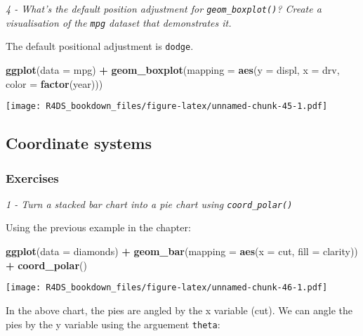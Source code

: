 \documentclass[]{article}
\newenvironment{Shaded}{\begin{snugshade}}{\end{snugshade}}
\newcommand{\KeywordTok}[1]{\textcolor[rgb]{0.13,0.29,0.53}{\textbf{#1}}}
\newcommand{\DataTypeTok}[1]{\textcolor[rgb]{0.13,0.29,0.53}{#1}}
\newcommand{\StringTok}[1]{\textcolor[rgb]{0.31,0.60,0.02}{#1}}
\newcommand{\OperatorTok}[1]{\textcolor[rgb]{0.81,0.36,0.00}{\textbf{#1}}}
\newcommand{\NormalTok}[1]{#1}
\theoremstyle{definition}
\theoremstyle{definition}
\theoremstyle{definition}
\theoremstyle{remark}
\begin{document}
\emph{4 - What's the default position adjustment for
\texttt{geom\_boxplot()}? Create a visualisation of the \texttt{mpg}
dataset that demonstrates it.}

The default positional adjustment is \texttt{dodge}.

\begin{Shaded}
\begin{Highlighting}[]
\KeywordTok{ggplot}\NormalTok{(}\DataTypeTok{data =}\NormalTok{ mpg) }\OperatorTok{+}
\StringTok{  }\KeywordTok{geom_boxplot}\NormalTok{(}\DataTypeTok{mapping =} \KeywordTok{aes}\NormalTok{(}\DataTypeTok{y =}\NormalTok{ displ, }\DataTypeTok{x =}\NormalTok{ drv, }\DataTypeTok{color =} \KeywordTok{factor}\NormalTok{(year)))}
\end{Highlighting}
\end{Shaded}

\texttt{[image: R4DS\_bookdown\_files/figure-latex/unnamed-chunk-45-1.pdf]}

\subsection{Coordinate systems}\label{coordinate-systems}

\subsubsection{Exercises}\label{exercises-6}

\emph{1 - Turn a stacked bar chart into a pie chart using
\texttt{coord\_polar()}}

Using the previous example in the chapter:

\begin{Shaded}
\begin{Highlighting}[]
\KeywordTok{ggplot}\NormalTok{(}\DataTypeTok{data =}\NormalTok{ diamonds) }\OperatorTok{+}\StringTok{ }
\StringTok{  }\KeywordTok{geom_bar}\NormalTok{(}\DataTypeTok{mapping =} \KeywordTok{aes}\NormalTok{(}\DataTypeTok{x =}\NormalTok{ cut, }\DataTypeTok{fill =}\NormalTok{ clarity)) }\OperatorTok{+}
\StringTok{  }\KeywordTok{coord_polar}\NormalTok{()}
\end{Highlighting}
\end{Shaded}

\texttt{[image: R4DS\_bookdown\_files/figure-latex/unnamed-chunk-46-1.pdf]}

In the above chart, the pies are angled by the x variable (cut). We can
angle the pies by the y variable using the arguement \texttt{theta}:
\end{document}
